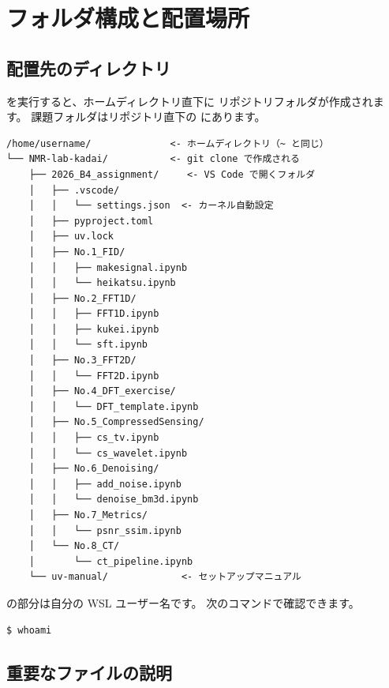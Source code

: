 \chapter{フォルダ構成と配置場所}

\section{配置先のディレクトリ}

 を実行すると、ホームディレクトリ直下に
リポジトリフォルダが作成されます。
課題フォルダはリポジトリ直下の  にあります。

\begin{wslbox}[フォルダ構成]
\begin{lstlisting}[style=bash]
/home/username/              <- ホームディレクトリ（~ と同じ）
└── NMR-lab-kadai/           <- git clone で作成される
    ├── 2026_B4_assignment/     <- VS Code で開くフォルダ
    │   ├── .vscode/
    │   │   └── settings.json  <- カーネル自動設定
    │   ├── pyproject.toml
    │   ├── uv.lock
    │   ├── No.1_FID/
    │   │   ├── makesignal.ipynb
    │   │   └── heikatsu.ipynb
    │   ├── No.2_FFT1D/
    │   │   ├── FFT1D.ipynb
    │   │   ├── kukei.ipynb
    │   │   └── sft.ipynb
    │   ├── No.3_FFT2D/
    │   │   └── FFT2D.ipynb
    │   ├── No.4_DFT_exercise/
    │   │   └── DFT_template.ipynb
    │   ├── No.5_CompressedSensing/
    │   │   ├── cs_tv.ipynb
    │   │   └── cs_wavelet.ipynb
    │   ├── No.6_Denoising/
    │   │   ├── add_noise.ipynb
    │   │   └── denoise_bm3d.ipynb
    │   ├── No.7_Metrics/
    │   │   └── psnr_ssim.ipynb
    │   └── No.8_CT/
    │       └── ct_pipeline.ipynb
    └── uv-manual/             <- セットアップマニュアル
\end{lstlisting}
\end{wslbox}

\begin{notebox}
 の部分は自分の WSL ユーザー名です。
次のコマンドで確認できます。

\begin{wslbox}[ユーザー名の確認]
\begin{lstlisting}[style=bash]
$ whoami
\end{lstlisting}
\end{wslbox}
\end{notebox}

\section{重要なファイルの説明}

